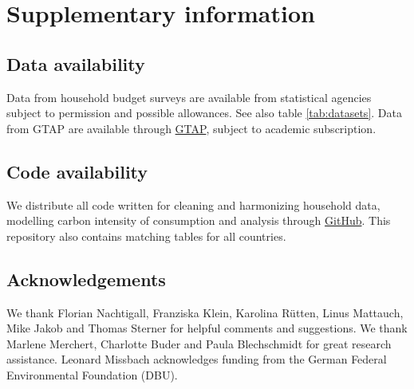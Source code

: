 \documentclass[12pt, a4paper]{article}
\begin{document}
\begin{refsection}

\clearpage


\clearpage


\clearpage


\clearpage


\clearpage

\begin{refcontext}[sorting=nyt]
\printbibliography[heading=subbibliography, title ={References (Appendix)}]
\end{refcontext}
\end{refsection}

\clearpage

\section{Supplementary information}

\subsection{Data availability} \label{data_availability} Data from household budget surveys are available from statistical agencies subject to permission and possible allowances. See also table \ref{tab:datasets}. Data from GTAP are available through \href{https://www.gtap.agecon.purdue.edu/}{GTAP}, subject to academic subscription.  

\subsection{Code availability} \label{code}
We distribute all code written for cleaning and harmonizing household data, modelling carbon intensity of consumption and analysis through \href{https://github.com/lmissbach/Carbon-Intensity-2023}{GitHub}. This repository also contains matching tables for all countries.

\subsection{Acknowledgements} \label{acknowledgements}

We thank Florian Nachtigall, Franziska Klein, Karolina Rütten, Linus Mattauch, Mike Jakob and Thomas Sterner for helpful comments and suggestions. 
We thank Marlene Merchert, Charlotte Buder and Paula Blechschmidt for great research assistance. 
Leonard Missbach acknowledges funding from the German Federal Environmental Foundation (DBU).
\end{document}
